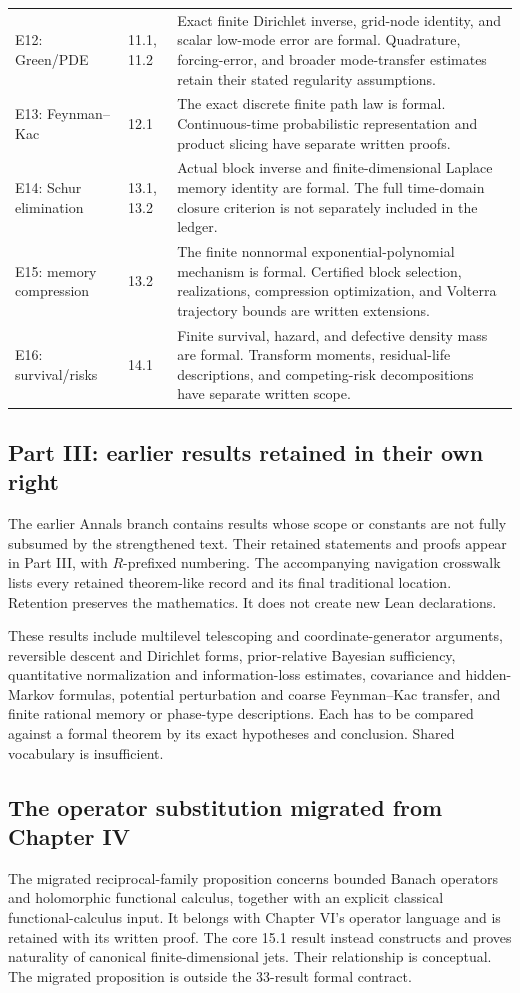 \begin{longtable}{@{}p{.24\linewidth}p{.18\linewidth}p{.51\linewidth}@{}}
E12: Green/PDE & 11.1, 11.2 & Exact finite Dirichlet inverse, grid-node identity, and scalar low-mode error are formal. Quadrature, forcing-error, and broader mode-transfer estimates retain their stated regularity assumptions.\\
E13: Feynman--Kac & 12.1 & The exact discrete finite path law is formal. Continuous-time probabilistic representation and product slicing have separate written proofs.\\
E14: Schur elimination & 13.1, 13.2 & Actual block inverse and finite-dimensional Laplace memory identity are formal. The full time-domain closure criterion is not separately included in the ledger.\\
E15: memory compression & 13.2 & The finite nonnormal exponential-polynomial mechanism is formal. Certified block selection, realizations, compression optimization, and Volterra trajectory bounds are written extensions.\\
E16: survival/risks & 14.1 & Finite survival, hazard, and defective density mass are formal. Transform moments, residual-life descriptions, and competing-risk decompositions have separate written scope.\\
\bottomrule\end{longtable}

\subsection{Part III: earlier results retained in their own right}
The earlier Annals branch contains results whose scope or constants are not fully subsumed by the strengthened text. Their retained statements and proofs appear in Part III, with $R$-prefixed numbering. The accompanying navigation crosswalk lists every retained theorem-like record and its final traditional location. Retention preserves the mathematics. It does not create new Lean declarations.

These results include multilevel telescoping and coordinate-generator arguments, reversible descent and Dirichlet forms, prior-relative Bayesian sufficiency, quantitative normalization and information-loss estimates, covariance and hidden-Markov formulas, potential perturbation and coarse Feynman--Kac transfer, and finite rational memory or phase-type descriptions. Each has to be compared against a formal theorem by its exact hypotheses and conclusion. Shared vocabulary is insufficient.

\subsection{The operator substitution migrated from Chapter IV}
The migrated reciprocal-family proposition concerns bounded Banach operators and holomorphic functional calculus, together with an explicit classical functional-calculus input. It belongs with Chapter VI's operator language and is retained with its written proof. The core 15.1 result instead constructs and proves naturality of canonical finite-dimensional jets. Their relationship is conceptual. The migrated proposition is outside the 33-result formal contract.

